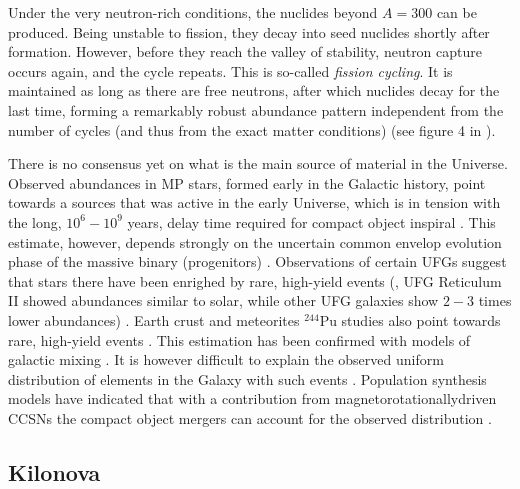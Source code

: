 %

Under the very neutron-rich conditions, 
the nuclides beyond $A=300$ can be produced. Being unstable to fission, they 
decay into seed nuclides shortly after formation.
However, before they reach the valley of stability, neutron capture occurs again, and the cycle repeats.
This is so-called \textit{fission cycling}.
It is maintained as long as there are free neutrons, after which nuclides decay 
for the last time, forming a remarkably robust abundance pattern independent from the 
number of cycles (and thus from the exact matter conditions) 
(see figure 4 in \citet{Korobkin:2012uy}). 

There is no consensus yet on what is the main source of \rproc{} material in the 
Universe. 
Observed \rproc{} abundances in \ac{MP} stars, formed early in the Galactic history, 
point towards a sources that was active in the early Universe, which is in tension with the long, 
$10^{6} - 10^{9}$ years, delay time required for compact object inspiral 
\citep{DeDonder:2004cx,Dominik:2012kk}. This estimate, however, depends strongly on the 
uncertain common envelop evolution phase of the massive binary (progenitors)
\citep[\eg][]{Dominik:2012kk}.
%
Observations of certain \acp{UFG} suggest that stars there have been enrighed by rare, 
high-yield events (\eg, \ac{UFG} Reticulum II showed abundances similar to solar, 
while other \ac{UFG} galaxies show $2-3$ times lower abundances) \citep{Ji:2016}.
%
Earth crust and meteorites $^{244}$Pu studies also point towards rare, high-yield 
events \citep{Wallner:2015,Tsujimoto:2017}. This estimation has been confirmed with 
models of galactic mixing \citep{Hotokezaka:2015zea}.
%
It is however difficult to explain the observed uniform distribution of \rproc{} 
elements in the Galaxy with such events \citep{Argast:2003he}.
%
Population synthesis models have indicated that with a contribution from 
magnetorotationallydriven \acp{CCSN} the compact object mergers can account for the 
observed distribution \citep{Ishimaru:2015,Cescutti:2015,Wehmeyer:2015,VanDeVoort:2015}.



\subsection{Kilonova}


